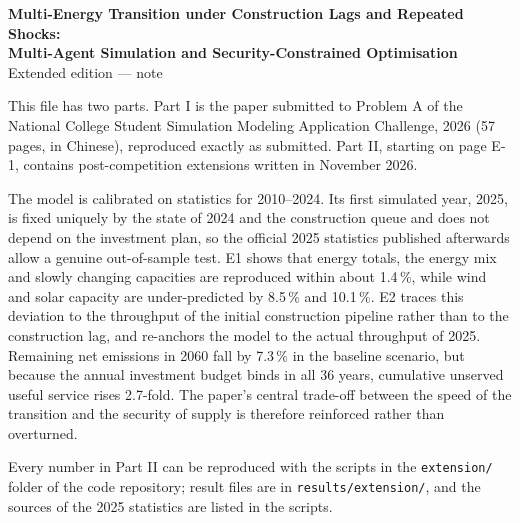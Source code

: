 
\graphicspath{{../../figures/extension/}}

\thispagestyle{empty}
\begin{center}
{\Large\bfseries Multi-Energy Transition under Construction Lags and Repeated Shocks:\\[0.2em] Multi-Agent Simulation and Security-Constrained Optimisation}\\[0.7em]
{\large Extended edition --- note}
\end{center}
\vspace{0.8em}

This file has two parts. Part I is the paper submitted to Problem A of the National College Student Simulation Modeling Application Challenge, 2026 (57 pages, in Chinese), reproduced exactly as submitted. Part II, starting on page E-1, contains post-competition extensions written in November 2026.

The model is calibrated on statistics for 2010--2024. Its first simulated year, 2025, is fixed uniquely by the state of 2024 and the construction queue and does not depend on the investment plan, so the official 2025 statistics published afterwards allow a genuine out-of-sample test. E1 shows that energy totals, the energy mix and slowly changing capacities are reproduced within about 1.4\,\%, while wind and solar capacity are under-predicted by 8.5\,\% and 10.1\,\%. E2 traces this deviation to the throughput of the initial construction pipeline rather than to the construction lag, and re-anchors the model to the actual throughput of 2025. Remaining net emissions in 2060 fall by 7.3\,\% in the baseline scenario, but because the annual investment budget binds in all 36 years, cumulative unserved useful service rises 2.7-fold. The paper's central trade-off between the speed of the transition and the security of supply is therefore reinforced rather than overturned.

Every number in Part II can be reproduced with the scripts in the \texttt{extension/} folder of the code repository; result files are in \texttt{results/extension/}, and the sources of the 2025 statistics are listed in the scripts.

